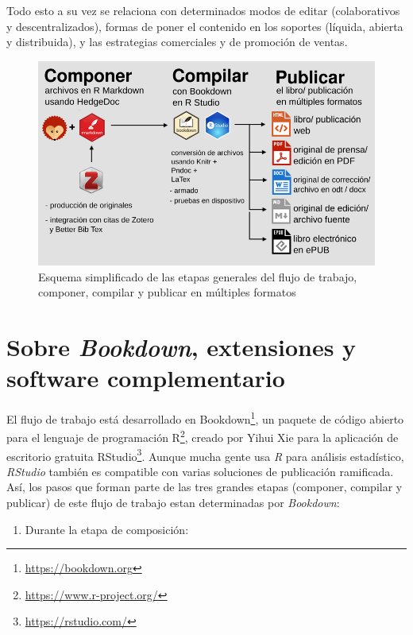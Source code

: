 \documentclass[
]{krantz}
\DeclareRobustCommand{\href}[2]{#2\footnote{\url{#1}}}
\providecommand{\tightlist}{%
  \setlength{\itemsep}{0pt}\setlength{\parskip}{0pt}}
\begin{document}
Todo esto a su vez se relaciona con determinados modos de editar (colaborativos y descentralizados), formas de poner el contenido en los soportes (líquida, abierta y distribuida), y las estrategias comerciales y de promoción de ventas.



\begin{figure}

{\centering \includegraphics[width=0.8\linewidth]{images/workflow} 

}

\caption{Esquema simplificado de las etapas generales del flujo de trabajo, componer, compilar y publicar en múltiples formatos}\label{fig:workflow}
\end{figure}

\hypertarget{sobre-bookdown-extensiones-y-software-complementario}{%
\section{\texorpdfstring{Sobre \emph{Bookdown}, extensiones y software complementario}{Sobre Bookdown, extensiones y software complementario}}\label{sobre-bookdown-extensiones-y-software-complementario}}

El flujo de trabajo está desarrollado en \href{https://bookdown.org}{Bookdown}, un paquete de código abierto para el lenguaje de programación \href{https://www.r-project.org/}{R}, creado por Yihui Xie para la aplicación de escritorio gratuita \href{https://rstudio.com/}{RStudio}. Aunque mucha gente usa \emph{R} para análisis estadístico, \emph{RStudio} también es compatible con varias soluciones de publicación ramificada. Así, los pasos que forman parte de las tres grandes etapas (componer, compilar y publicar) de este flujo de trabajo estan determinadas por \emph{Bookdown}:

\begin{enumerate}
\def\labelenumi{\arabic{enumi}.}
\tightlist
\item
  Durante la etapa de composición:
\end{enumerate}
\end{document}
